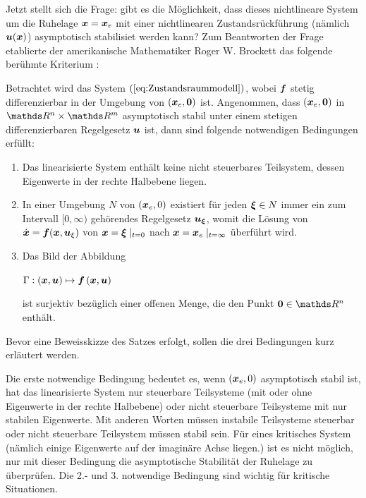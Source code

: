 Jetzt stellt sich die Frage: gibt es die Möglichkeit, dass dieses nichtlineare System um die Ruhelage $\boldsymbol x=\boldsymbol x_{e}$ mit einer nichtlinearen Zustandsrückführung (nämlich $\boldsymbol u(\boldsymbol x)$) asymptotisch stabilisiet werden kann? Zum Beantworten der Frage etablierte der amerikanische Mathematiker Roger W. Brockett das folgende berühmte Kriterium \cite{brockett1983asymptotic}:
\begin{theorem}\label{the:Brockett-Bedingung}
	Betrachtet wird das System $(\ref{eq:Zustandsraummodell})$, wobei $\boldsymbol f$ stetig differenzierbar in der Umgebung von $(\boldsymbol x_{e},\boldsymbol 0)$ ist. Angenommen, dass $(\boldsymbol x_{e},\boldsymbol 0)$ in $\Reals^{n}\times\Reals^{m}$ asymptotisch stabil unter einem stetigen differenzierbaren Regelgesetz $\boldsymbol u$ ist, dann sind folgende notwendigen Bedingungen erfüllt: 
	\begin{enumerate}
		\item Das linearisierte System enthält keine nicht steuerbares Teilsystem, dessen Eigenwerte in der rechte Halbebene liegen. 
		\item In einer Umgebung $N$ von $(\boldsymbol x_{e},0)$ existiert für jeden $\boldsymbol \xi \in N$ immer ein zum Intervall $[0,\infty)$ gehörendes Regelgesetz $\boldsymbol u_{\boldsymbol \xi}$, womit die Lösung von $\dot{\boldsymbol x} =\boldsymbol f(\boldsymbol x, \boldsymbol u_{\xi})$ von $\boldsymbol x = \boldsymbol \xi\mid _{t=0}$ nach $\boldsymbol x = \boldsymbol x_{e}\mid _{t=\infty}$ überführt wird.
		\item Das Bild der Abbildung
		\begin{center}$\Gamma: \left ( \boldsymbol x,\boldsymbol u \right ) \mapsto \boldsymbol f\left ( \boldsymbol x,\boldsymbol u \right )$\end{center}
		ist surjektiv bezüglich einer offenen Menge, die den Punkt $\vect{0}\in \Reals^{n}$ enthält.
	\end{enumerate} 
\end{theorem}
Bevor eine Beweisskizze des Satzes erfolgt, sollen die drei Bedingungen kurz erläutert werden.

Die erste notwendige Bedingung bedeutet es, wenn $(\boldsymbol x_{e},0)$ asymptotisch stabil ist, hat das linearisierte System nur steuerbare Teilsysteme (mit oder ohne Eigenwerte in der rechte Halbebene) oder nicht steuerbare Teilsysteme mit nur stabilen Eigenwerte. Mit anderen Worten müssen instabile Teilsysteme steuerbar oder nicht steuerbare Teilsystem müssen stabil sein. Für eines kritisches System  (nämlich einige Eigenwerte auf der imaginäre Achse liegen.) ist es nicht möglich, nur mit dieser Bedingung die asymptotische Stabilität der Ruhelage zu überprüfen. Die 2.- und 3. notwendige Bedingung sind wichtig für kritische Situationen.

